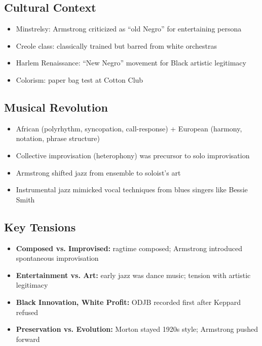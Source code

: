 \documentclass[11pt, letterpaper]{article}
\begin{document}
\subsection{Cultural Context}
\begin{itemize}
    \item Minstrelsy: Armstrong criticized as ``old Negro'' for entertaining persona
    \item Creole class: classically trained but barred from white orchestras
    \item Harlem Renaissance: ``New Negro'' movement for Black artistic legitimacy
    \item Colorism: paper bag test at Cotton Club
\end{itemize}

\subsection{Musical Revolution}
\begin{itemize}
    \item African (polyrhythm, syncopation, call-response) + European (harmony, notation, phrase structure)
    \item Collective improvisation (heterophony) was precursor to solo improvisation
    \item Armstrong shifted jazz from ensemble to soloist's art
    \item Instrumental jazz mimicked vocal techniques from blues singers like Bessie Smith
\end{itemize}

\subsection{Key Tensions}
\begin{itemize}
    \item \textbf{Composed vs. Improvised:} ragtime composed; Armstrong introduced spontaneous improvisation
    \item \textbf{Entertainment vs. Art:} early jazz was dance music; tension with artistic legitimacy
    \item \textbf{Black Innovation, White Profit:} ODJB recorded first after Keppard refused
    \item \textbf{Preservation vs. Evolution:} Morton stayed 1920s style; Armstrong pushed forward
\end{itemize}
\end{document}
